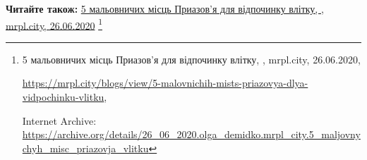  
 
 
 
 

\def\pubIA{https://archive.org/details/26_06_2020.olga_demidko.mrpl_city.5_maljovnychyh_misc_priazovja_vlitku}
\def\pubTitle{5 мальовничих місць Приазов'я для відпочинку влітку}
\def\pubDate{26.06.2020}
\def\pubOrigin{https://mrpl.city/blogs/view/5-malovnichih-mists-priazovya-dlya-vidpochinku-vlitku}
\def\pubAuthor{\pubAuthorDemidko}

\textbf{Читайте також:} \href{\pubIA}{%
\pubTitle, \pubAuthor, mrpl.city, \pubDate}%
\footnote{\pubTitle, \pubAuthor, mrpl.city, \pubDate, \par\url{\pubOrigin}, \par Internet Archive: \url{\pubIA}}
